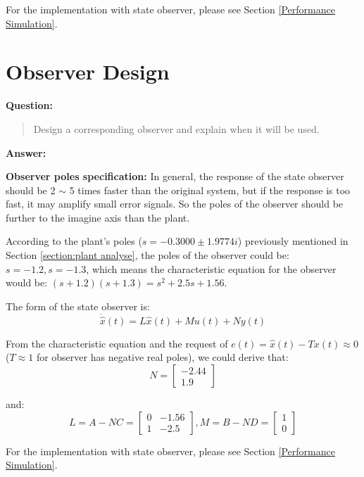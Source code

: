 \documentclass[12pt, oneside]{article}
\begin{document}
For the implementation with state observer, please see Section \ref{Performance Simulation}.


\section{Observer Design}
\textbf{Question:}
\begin{quote}
Design a corresponding observer and explain when it will be used. 
\end{quote}
\textbf{Answer:}


\textbf{Observer poles specification:} In general, the response of the state observer should be 2 $\sim$ 5 times faster than the original system\cite{CourseMaterial}, but if the response is too fast, it may amplify small error signals. So the poles of the observer should be further to the imagine axis than the plant.

According to the plant's poles ($s = -0.3000\pm1.9774i$) previously mentioned in Section \ref{section:plant analyse}, the poles of the observer could be: $s=-1.2, s=-1.3$, which means the characteristic equation for the observer would be: $(s+1.2)(s+1.3)=s^2+2.5s+1.56$.

The form of the state observer is:
\begin{equation}
    \dot{\hat{x}}(t) = L\hat{x}(t)+Mu(t)+Ny(t)
\end{equation}

From the characteristic equation and the request of $e(t) = \hat{x}(t)-Tx(t) \approx 0$ ($T \approx 1$ for observer has negative real poles), we could derive that:
\begin{equation}
    N = 
    \left[\begin{array}{ccc}-2.44\\1.9\end{array}\right]
\end{equation}

and:
\begin{equation}
    L = A-NC = \left[\begin{array}{ccc}0&-1.56\\1&-2.5\end{array}\right], 
    M = B-ND = \left[\begin{array}{ccc}1\\0\end{array}\right]
\end{equation}

For the implementation with state observer, please see Section \ref{Performance Simulation}.
\end{document}
